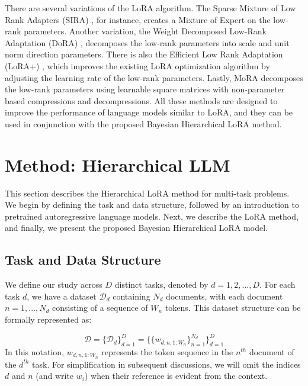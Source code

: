 \documentclass[fullpaper,final]{nldl}
\begin{document}
There are several variations of the LoRA algorithm. 
The Sparse Mixture of Low Rank Adapters (SIRA) \cite{zhuSiRASparseMixture2023}, for instance, creates a Mixture of Expert on the low-rank parameters. 
Another variation, the Weight Decomposed Low-Rank Adaptation (DoRA) \cite{hayouLoRAEfficientLow2024}, decomposes the low-rank parameters into scale and unit norm direction parameters. 
There is also the Efficient Low Rank Adaptation (LoRA+) \cite{hayouLoRAEfficientLow2024}, which improves the existing LoRA optimization algorithm by adjusting the learning rate of the low-rank parameters.
Lastly, MoRA \cite{jiangMoRAHighRankUpdating2024} decomposes the low-rank parameters using learnable square matrices with non-parameter based compressions and decompressions.
All these methods are designed to improve the performance of language models similar to LoRA, and they can be used in conjunction with the proposed Bayesian Hierarchical LoRA method.

\section{Method: Hierarchical LLM} \label{sec:method}
This section describes the Hierarchical LoRA method for multi-task problems. 
We begin by defining the task and data structure, followed by an introduction to pretrained autoregressive language models. 
Next, we describe the LoRA method, and finally, we present the proposed Bayesian Hierarchical LoRA model.

\subsection{Task and Data Structure}
We define our study across $D$ distinct tasks, denoted by $d=1,2,...,D$. 
For each task $d$, we have a dataset $\mathcal{D}_d$ containing $N_d$ documents, with each document $n=1,..., N_d$ consisting of a sequence of $W_n$ tokens. 
This dataset structure can be formally represented as:

\begin{equation} \label{eq:data}
\mathcal{D} = \{ \mathcal{D}_d \}_{d=1}^D  =  \{ \{ w_{d,n,1:W_n} \}_{n=1}^{N_d} \}_{d=1}^D
\end{equation}
%
In this notation, $w_{d,n,1:W_n}$ represents the token sequence in the $n^{th}$ document of the $d^{th}$ task. 
For simplification in subsequent discussions, we will omit the indices $d$ and $n$ (and write $w_i$) when their reference is evident from the context.
\end{document}
